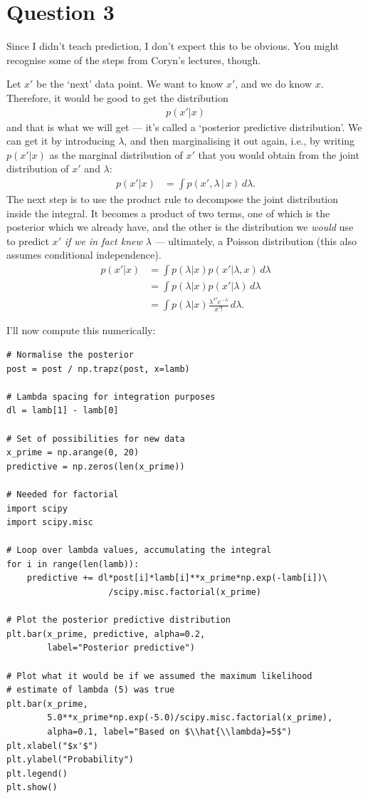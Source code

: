 \documentclass[a4paper, 12pt]{article}
\begin{document}
\section*{Question 3}
Since I didn't teach prediction, I don't expect this to be obvious. You
might recognise some of the steps from Coryn's lectures, though.

Let $x'$ be the `next' data point. We want to know $x'$, and we do know
$x$. Therefore, it would be good to get the distribution
\begin{align}
p(x' | x)
\end{align}
and that is what we will get --- it's called a `posterior predictive
distribution'. We can get it by introducing $\lambda$, and
then marginalising it out again, i.e., by writing $p(x'|x)$ as
the marginal distribution of $x'$ that you would obtain from
the joint distribution of $x'$ and $\lambda$:
\begin{align}
p(x' | x) &= \int p(x', \lambda \,|\, x) \, d\lambda.
\end{align}
The next step is to use the product rule to decompose the joint
distribution inside the integral. It becomes a product of two terms,
one of which is the posterior which we already have, and the other
is the distribution we {\em would} use to predict $x'$ {\em if we
in fact knew $\lambda$} --- ultimately, a Poisson distribution
(this also assumes conditional independence).
\begin{align}
p(x' | x) &= \int p(\lambda | x)p(x' | \lambda, x) \, d\lambda \\
          &= \int p(\lambda | x)p(x' | \lambda) \, d\lambda \\
          &= \int p(\lambda | x) \frac{\lambda^{x!}e^{-\lambda}}{x'!} \, d\lambda.
\end{align}

I'll now compute this numerically:

\begin{verbatim}
# Normalise the posterior
post = post / np.trapz(post, x=lamb)

# Lambda spacing for integration purposes
dl = lamb[1] - lamb[0]

# Set of possibilities for new data
x_prime = np.arange(0, 20)
predictive = np.zeros(len(x_prime))

# Needed for factorial
import scipy
import scipy.misc

# Loop over lambda values, accumulating the integral
for i in range(len(lamb)):
    predictive += dl*post[i]*lamb[i]**x_prime*np.exp(-lamb[i])\
                    /scipy.misc.factorial(x_prime)

# Plot the posterior predictive distribution
plt.bar(x_prime, predictive, alpha=0.2,
        label="Posterior predictive")

# Plot what it would be if we assumed the maximum likelihood
# estimate of lambda (5) was true
plt.bar(x_prime,
        5.0**x_prime*np.exp(-5.0)/scipy.misc.factorial(x_prime),
        alpha=0.1, label="Based on $\\hat{\\lambda}=5$")
plt.xlabel("$x'$")
plt.ylabel("Probability")
plt.legend()
plt.show()
\end{verbatim}
\end{document}
